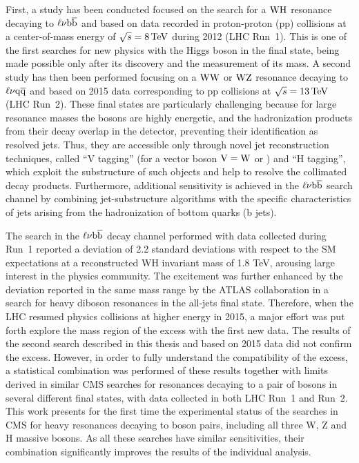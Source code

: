 First, a study has been conducted focused on the search for a $\mathrm{W}\mathrm{H}$ resonance decaying to $\ell\nu{\mathrm{b}\overline{\mathrm{b}}}$ and based on data recorded in proton-proton (pp) collisions at a center-of-mass energy of $\sqrt{s} = 8\,\text{Te\hspace{-.08em}V}$ during 2012 (LHC Run~1). This is one of the first searches for new physics with the Higgs boson in the final state, being made possible only after its discovery and the measurement of its mass.
A second study has then been performed focusing on a $\mathrm{W}\mathrm{W}$ or $\mathrm{W}\mathrm{Z}$ resonance decaying to $\ell\nu\mathrm{q}\overline{\mathrm{q}}$ and based on 2015 data corresponding to pp collisions at $\sqrt{s} = 13\,\text{Te\hspace{-.08em}V}$ (LHC Run~2).
These final states are particularly challenging because for large resonance masses the bosons are highly energetic, and the hadronization products from their decay overlap in the detector, preventing their identification as resolved jets.
Thus, they are accessible only through novel jet reconstruction techniques, called ``V tagging'' (for a vector boson $\mathrm{V} = \mathrm{W}$ or \PZ) and ``H tagging'', which exploit the substructure of such objects and help to resolve the collimated decay products.
Furthermore, additional sensitivity is achieved in the $\ell\nu{\mathrm{b}\overline{\mathrm{b}}}$ search channel by combining jet-substructure algorithms with the specific characteristics of jets arising from the hadronization of bottom quarks (b jets).

The search in the $\ell\nu{\mathrm{b}\overline{\mathrm{b}}}$ decay channel performed with data collected during Run~1 reported a deviation of 2.2 standard deviations with respect to the SM expectations at a reconstructed WH invariant mass of 1.8 TeV, arousing large interest in the physics community. The excitement was further enhanced by the deviation reported in the same mass range by the ATLAS collaboration in a search for heavy diboson resonances in the all-jets final state. 
Therefore, when the LHC resumed physics collisions at higher energy in 2015, a major effort was put forth explore the mass region of the excess with the first new data. The results of the second search described in this thesis and based on 2015 data did not confirm the excess. However, in order to fully understand the compatibility of the excess, a statistical combination was performed of these results together with limits derived in similar CMS searches for resonances decaying to a pair of bosons in several different final states, with data collected in both LHC Run~1 and Run~2.
This work presents for the first time the experimental status of the searches in CMS for heavy resonances decaying to boson pairs, including all three W, Z and H massive bosons.
As all these searches have similar sensitivities, their combination significantly improves the results of the individual analysis.\\

